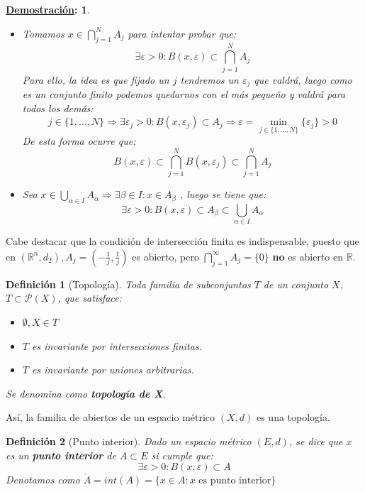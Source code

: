\documentclass[10pt,a4paper,openright]{book}
\theoremstyle{break}
\newtheorem*{defi}{Definición}
\newtheorem*{demo}{\underline{Demostración}:}
\begin{document}
\begin{demo}
\begin{itemize}
\item Tomamos $x \in \displaystyle\bigcap_{j=1}^N A_j$ para intentar probar que:
$$\exists \varepsilon > 0 : B(x,\varepsilon) \subset \bigcap_{j=1}^N A_j$$
Para ello, la idea es que fijado un $j$ tendremos un $\varepsilon_j$ que valdrá, luego como es un conjunto finito podemos quedarnos con el más pequeño y valdrá para todos los demás:
$$j \in \{1, \ldots , N\} \Rightarrow \exists \varepsilon_j > 0 : B(x,\varepsilon_j) \subset A_j \Rightarrow \varepsilon = \underset{j \in \{1, \ldots , N\}}{\min}\{\varepsilon_j\} > 0$$
De esta forma ocurre que:
$$B(x,\varepsilon) \subset \bigcap_{j=1}^N B(x,\varepsilon_j)\subset  \bigcap_{j=1}^N A_j$$
\item Sea $x \in \displaystyle\bigcup_{\alpha \in I} A_\alpha \Rightarrow \exists \beta \in I : x \in A_\beta $ , luego se tiene que:
$$\exists \varepsilon > 0 : B(x, \varepsilon) \subset A_\beta \subset \bigcup_{\alpha \in I} A_\alpha$$
\end{itemize}
\end{demo}

Cabe destacar que la condición de intersección finita es indispensable, puesto que en $(\mathbb{R}^n, d_2), A_j=\left(-\frac{1}{j}, \frac{1}{j}\right)$ es abierto, pero $\displaystyle\bigcap_{j=1}^\infty A_j = \{0\}$  \textbf{no} es abierto en $\mathbb{R}$.

\begin{defi}[Topología]
Toda familia de subconjuntos $T$ de un conjunto $X$, $T \subset \mathcal P (X)$, que satisface:
\begin{itemize}
\item $\emptyset, X \in T$

\item $T$ es invariante por intersecciones finitas.

\item $T$ es invariante por uniones arbitrarias.
\end{itemize}

Se denomina como \textbf{topología de X}.
\end{defi}

Así, la familia de abiertos de un espacio métrico $(X,d)$ es una topología.

\begin{defi}[Punto interior]
Dado un espacio métrico $(E,d)$, se dice que $x$ es un \textbf{punto interior} de $A \subset E$ si cumple que:
$$\exists \varepsilon > 0 : B(x, \varepsilon) \subset A$$
Denotamos como $\mathring{A} = int(A) = \{x \in A : x \mbox{ es punto interior}\}$
\end{defi}
\end{document}
